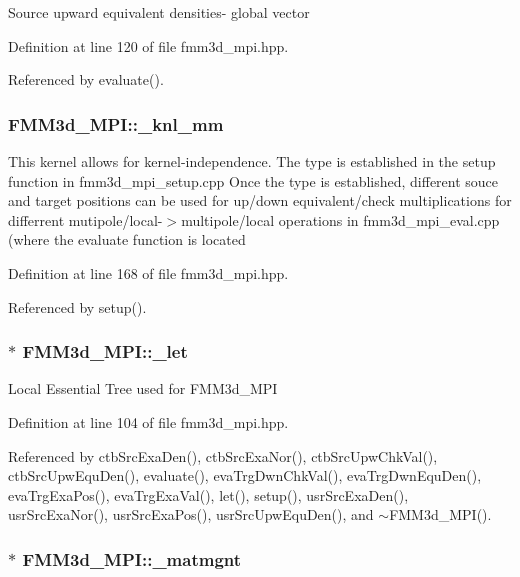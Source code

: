 Source upward equivalent densities- global vector 

Definition at line 120 of file fmm3d\_\-mpi.hpp.

Referenced by evaluate().
\subsubsection{ {\bf FMM3d\_\-MPI::\_\-knl\_\-mm}\hspace{0.3cm}{\tt  [protected]}}\label{classFMM3d__MPI_682802df2db70f31a8144d86c0116993_682802df2db70f31a8144d86c0116993}


This kernel allows for kernel-independence. The type is established in the setup function in fmm3d\_\-mpi\_\-setup.cpp Once the type is established, different souce and target positions can be used for up/down equivalent/check multiplications for differrent mutipole/local-$>$multipole/local operations in fmm3d\_\-mpi\_\-eval.cpp (where the evaluate function is located 

Definition at line 168 of file fmm3d\_\-mpi.hpp.

Referenced by setup().
\subsubsection{$\ast$ {\bf FMM3d\_\-MPI::\_\-let}\hspace{0.3cm}{\tt  [protected]}}\label{classFMM3d__MPI_5ec1dc5c086621178fb0d5330b42d25f_5ec1dc5c086621178fb0d5330b42d25f}


Local Essential Tree used for FMM3d\_\-MPI 

Definition at line 104 of file fmm3d\_\-mpi.hpp.

Referenced by ctb\-Src\-Exa\-Den(), ctb\-Src\-Exa\-Nor(), ctb\-Src\-Upw\-Chk\-Val(), ctb\-Src\-Upw\-Equ\-Den(), evaluate(), eva\-Trg\-Dwn\-Chk\-Val(), eva\-Trg\-Dwn\-Equ\-Den(), eva\-Trg\-Exa\-Pos(), eva\-Trg\-Exa\-Val(), let(), setup(), usr\-Src\-Exa\-Den(), usr\-Src\-Exa\-Nor(), usr\-Src\-Exa\-Pos(), usr\-Src\-Upw\-Equ\-Den(), and $\sim$FMM3d\_\-MPI().
\subsubsection{$\ast$ {\bf FMM3d\_\-MPI::\_\-matmgnt}\hspace{0.3cm}{\tt  [protected]}}\label{classFMM3d__MPI_474e4a2b47111ab4d3c8574ec8418b21_474e4a2b47111ab4d3c8574ec8418b21}


